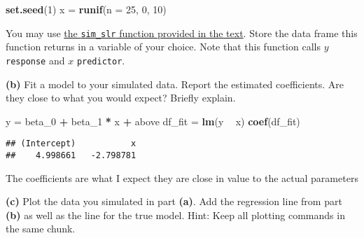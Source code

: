 \documentclass[]{article}
\newenvironment{Shaded}{\begin{snugshade}}{\end{snugshade}}
\newcommand{\DataTypeTok}[1]{\textcolor[rgb]{0.13,0.29,0.53}{#1}}
\newcommand{\DecValTok}[1]{\textcolor[rgb]{0.00,0.00,0.81}{#1}}
\newcommand{\KeywordTok}[1]{\textcolor[rgb]{0.13,0.29,0.53}{\textbf{#1}}}
\newcommand{\NormalTok}[1]{#1}
\newcommand{\OperatorTok}[1]{\textcolor[rgb]{0.81,0.36,0.00}{\textbf{#1}}}
\newcommand{\StringTok}[1]{\textcolor[rgb]{0.31,0.60,0.02}{#1}}
\begin{document}
\begin{Shaded}
\begin{Highlighting}[]
\KeywordTok{set.seed}\NormalTok{(}\DecValTok{1}\NormalTok{)}
\NormalTok{x =}\StringTok{ }\KeywordTok{runif}\NormalTok{(}\DataTypeTok{n =} \DecValTok{25}\NormalTok{, }\DecValTok{0}\NormalTok{, }\DecValTok{10}\NormalTok{)}
\end{Highlighting}
\end{Shaded}

You may use
\href{http://daviddalpiaz.github.io/appliedstats/simple-linear-regression.html\#simulating-slr}{the
\texttt{sim\_slr} function provided in the text}. Store the data frame
this function returns in a variable of your choice. Note that this
function calls \(y\) \texttt{response} and \(x\) \texttt{predictor}.

\textbf{(b)} Fit a model to your simulated data. Report the estimated
coefficients. Are they close to what you would expect? Briefly explain.

\begin{Shaded}
\begin{Highlighting}[]
\NormalTok{y =}\StringTok{ }\NormalTok{beta_}\DecValTok{0} \OperatorTok{+}\StringTok{ }\NormalTok{beta_}\DecValTok{1} \OperatorTok{*}\StringTok{ }\NormalTok{x }\OperatorTok{+}\StringTok{ }\NormalTok{above}
\NormalTok{df_fit =}\StringTok{ }\KeywordTok{lm}\NormalTok{(y }\OperatorTok{~}\StringTok{ }\NormalTok{x)}
\KeywordTok{coef}\NormalTok{(df_fit)}
\end{Highlighting}
\end{Shaded}

\begin{verbatim}
## (Intercept)           x 
##    4.998661   -2.798781
\end{verbatim}

The coefficients are what I expect they are close in value to the actual
parameters

\textbf{(c)} Plot the data you simulated in part \textbf{(a)}. Add the
regression line from part \textbf{(b)} as well as the line for the true
model. Hint: Keep all plotting commands in the same chunk.
\end{document}
